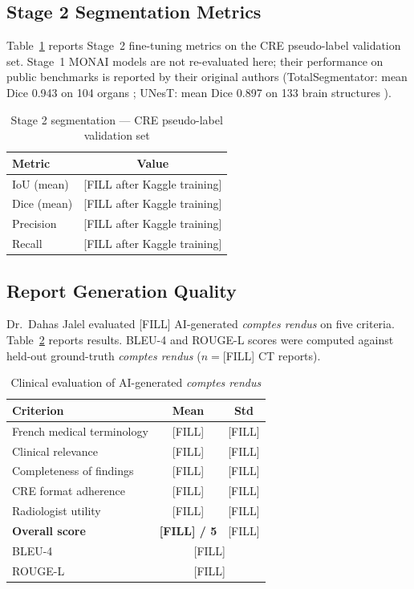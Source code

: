 \documentclass[conference]{IEEEtran}
\begin{document}
\subsection{Stage 2 Segmentation Metrics}

Table~\ref{tab:seg} reports Stage~2 fine-tuning metrics on the CRE
pseudo-label validation set. Stage~1 MONAI models are not re-evaluated here;
their performance on public benchmarks is reported by their original authors
(TotalSegmentator: mean Dice 0.943 on 104 organs \cite{wasserthal2023};
UNesT: mean Dice 0.897 on 133 brain structures \cite{yu2023}).

\begin{table}[h]
\caption{Stage 2 segmentation --- CRE pseudo-label validation set}
\label{tab:seg}
\centering
\renewcommand{\arraystretch}{1.15}
\begin{tabular}{lc}
\toprule
\textbf{Metric} & \textbf{Value} \\
\midrule
IoU (mean)  & {[FILL after Kaggle training]} \\
Dice (mean) & {[FILL after Kaggle training]} \\
Precision   & {[FILL after Kaggle training]} \\
Recall      & {[FILL after Kaggle training]} \\
\bottomrule
\end{tabular}
\end{table}

\subsection{Report Generation Quality}

Dr.~Dahas Jalel evaluated [FILL] AI-generated \textit{comptes rendus} on five
criteria. Table~\ref{tab:eval} reports results. BLEU-4 and ROUGE-L scores were
computed against held-out ground-truth \textit{comptes rendus}
($n=$[FILL] CT reports).

\begin{table}[h]
\caption{Clinical evaluation of AI-generated \textit{comptes rendus}}
\label{tab:eval}
\centering
\renewcommand{\arraystretch}{1.15}
\begin{tabular}{lcc}
\toprule
\textbf{Criterion} & \textbf{Mean} & \textbf{Std} \\
\midrule
French medical terminology  & {[FILL]} & {[FILL]} \\
Clinical relevance          & {[FILL]} & {[FILL]} \\
Completeness of findings    & {[FILL]} & {[FILL]} \\
CRE format adherence        & {[FILL]} & {[FILL]} \\
Radiologist utility         & {[FILL]} & {[FILL]} \\
\midrule
\textbf{Overall score}      & \textbf{[FILL] / 5} & {[FILL]} \\
\midrule
BLEU-4  & \multicolumn{2}{c}{[FILL]} \\
ROUGE-L & \multicolumn{2}{c}{[FILL]} \\
\bottomrule
\end{tabular}
\end{table}
\end{document}

